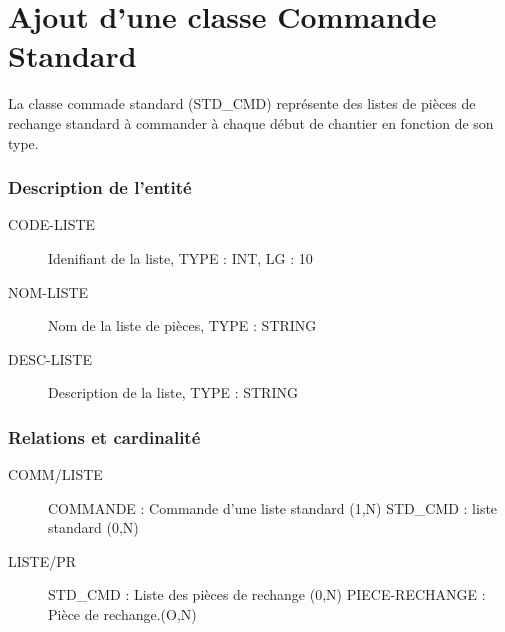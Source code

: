 \documentclass[a4paper]{article}
\begin{document}
\maketitle




\section{Ajout d'une classe Commande Standard}

La classe commade standard (STD_CMD) représente des listes de pièces de 
rechange standard à commander à chaque début de chantier en fonction de son type.

\subsubsection{Description de l'entité}



\begin{description}
    \item[CODE-LISTE] Idenifiant de la liste, TYPE : INT, LG : 10
    \item[NOM-LISTE] Nom de la liste de pièces, TYPE : STRING
    \item[DESC-LISTE] Description de la liste, TYPE : STRING
\end{description}

\subsubsection{Relations et cardinalité}

\begin{description}
    \item[COMM/LISTE] COMMANDE : Commande d'une liste standard (1,N)\el
        STD_CMD : liste standard (0,N)
    \item[LISTE/PR] STD_CMD : Liste des pièces de rechange (0,N)\el
        PIECE-RECHANGE :  Pièce de rechange.(O,N)
\end{description}


\subsection{}
\end{document}
